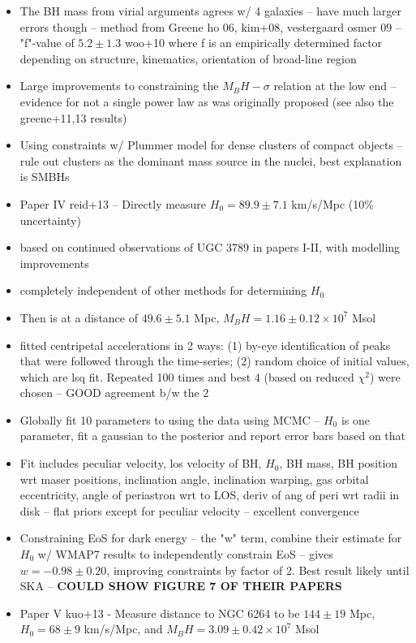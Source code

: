 \begin{itemize}
\item The BH mass from virial arguments agrees w/ 4 galaxies -- have much larger errors though -- method from Greene ho 06, kim+08, vestergaard osmer 09 -- "f"-value of $5.2\pm1.3$  woo+10 where f is an empirically determined factor depending on structure, kinematics, orientation of broad-line region
\item Large improvements to constraining the $M_BH-\sigma$ relation at the low end -- evidence for not a single power law as was originally proposed (see also the greene+11,13 results)
\item Using constraints w/ Plummer model for dense clusters of compact objects -- rule out clusters as the dominant mass source in the nuclei, best explanation is SMBHs
\item Paper IV reid+13 -- Directly measure $H_0=89.9\pm7.1$ km/s/Mpc (10\% uncertainty)
\item based on continued observations of UGC 3789 in papers I-II, with modelling improvements
\item completely independent of other methods for determining $H_0$
\item Then is at a distance of $49.6\pm5.1$ Mpc, $M_BH=1.16\pm0.12\times10^7$ Msol
\item fitted centripetal accelerations in 2 ways: (1) by-eye identification of peaks that were followed through the time-series; (2) random choice of initial values, which are lsq fit. Repeated 100 times and best 4 (based on reduced $\chi^2$) were chosen -- GOOD agreement b/w the 2
\item Globally fit 10 parameters to using the data using MCMC -- $H_0$ is one parameter, fit a gaussian to the posterior and report error bars based on that
\item Fit includes peculiar velocity, los velocity of BH, $H_0$, BH mass, BH position wrt maser positions, inclination angle, inclination warping, gas orbital eccentricity, angle of periastron wrt to LOS, deriv of ang of peri wrt radii in disk -- flat priors except for peculiar velocity -- excellent convergence
\item Constraining EoS for dark energy -- the "w" term, combine their estimate for $H_0$ w/ WMAP7 results to independently constrain EoS -- gives $w=-0.98\pm0.20$, improving constraints by factor of 2. Best result likely until SKA -- \textbf{COULD SHOW FIGURE 7 OF THEIR PAPERS}
\item Paper V kuo+13 - Measure distance to NGC 6264 to be $144\pm19$ Mpc, $H_0=68\pm9$ km/s/Mpc, and $M_BH = 3.09\pm0.42\times 10^7$ Msol

\end{itemize}
